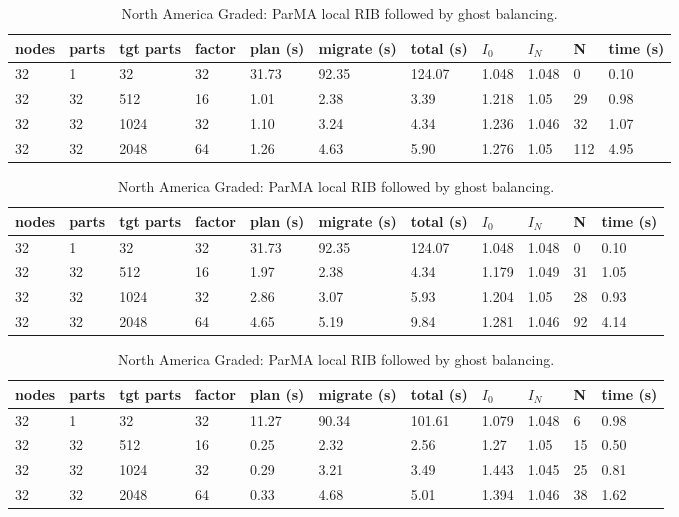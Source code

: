 \documentclass[a4paper]{article}
\begin{document}
\begin{table}
\centering
\caption{\label{tab:nalg}North America Graded: Zoltan Local ParMETIS followed by ghost balancing.}
\begin{tabular}{  l | l | l | l | l | l | l | l | l | l | l }
    \hline
    nodes & parts & tgt parts & factor & plan (s) & migrate (s) & total (s) & $I_0$ & $I_N$ & N & time (s) \\ \hline
    32 & 1 & 32 & 32 & 31.73 & 92.35 & 124.07 & 1.048 & 1.048 & 0 & 0.10 \\
    32 & 32 & 512 & 16 & 1.01 & 2.38 & 3.39 & 1.218 & 1.05 & 29 & 0.98 \\
    32 & 32 & 1024 & 32 & 1.10 & 3.24 & 4.34 & 1.236 & 1.046 & 32 & 1.07 \\
    32 & 32 & 2048 & 64 & 1.26 & 4.63 & 5.90 & 1.276 & 1.05 & 112 & 4.95 \\
\end{tabular}

\caption{\label{tab:nagg}North America Graded: Zoltan Global ParMETIS followed by ghost balancing.}
\begin{tabular}{  l | l | l | l | l | l | l | l | l | l | l }
    \hline
    nodes & parts & tgt parts & factor & plan (s) & migrate (s) & total (s) & $I_0$ & $I_N$ & N & time (s) \\ \hline
    32 & 1 & 32 & 32 & 31.73 & 92.35 & 124.07 & 1.048 & 1.048 & 0 & 0.10 \\
    32 & 32 & 512 & 16 & 1.97 & 2.38 & 4.34 & 1.179 & 1.049 & 31 & 1.05 \\
    32 & 32 & 1024 & 32 & 2.86 & 3.07 & 5.93 & 1.204 & 1.05 & 28 & 0.93 \\
    32 & 32 & 2048 & 64 & 4.65 & 5.19 & 9.84 & 1.281 & 1.046 & 92 & 4.14 \\
\end{tabular}

\caption{\label{tab:naplrib}North America Graded: ParMA local RIB followed by ghost balancing.}
\begin{tabular}{  l | l | l | l | l | l | l | l | l | l | l }
    \hline
    nodes & parts & tgt parts & factor & plan (s) & migrate (s) & total (s) & $I_0$ & $I_N$ & N & time (s) \\ \hline
    32 & 1 & 32 & 32 & 11.27 & 90.34 & 101.61 & 1.079 & 1.048 & 6 & 0.98 \\
    32 & 32 & 512 & 16 & 0.25 & 2.32 & 2.56 & 1.27 & 1.05 & 15 & 0.50 \\
    32 & 32 & 1024 & 32 & 0.29 & 3.21 & 3.49 & 1.443 & 1.045 & 25 & 0.81 \\
    32 & 32 & 2048 & 64 & 0.33 & 4.68 & 5.01 & 1.394 & 1.046 & 38 & 1.62 \\
\end{tabular}


\end{table}
\end{document}
